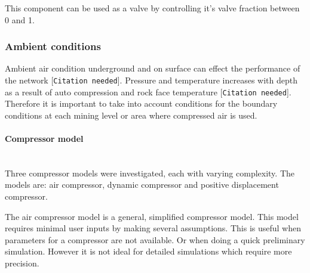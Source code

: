 		This component can be used as a valve by controlling it's valve fraction between 0 and 1.
		\subsubsection{Ambient conditions}
		Ambient air condition underground and on surface can effect the performance of the network [\texttt{Citation needed}]. Pressure and temperature increases with depth as a result of auto compression and rock face temperature [\texttt{Citation needed}]. Therefore it is important to take into account conditions for the boundary conditions at each mining level or area where compressed air is used.   
		\paragraph{Compressor model}\leavevmode\\
		Three compressor models were investigated, each with varying complexity. The models are: air compressor, dynamic compressor and positive displacement compressor. 
		\par 
		The air compressor model is a general, simplified compressor model. This model requires minimal user inputs by making several assumptions. This is useful when parameters for a compressor are not available. Or when doing a quick preliminary simulation. However it is not ideal for detailed simulations which require more precision. 
		\par 
		
